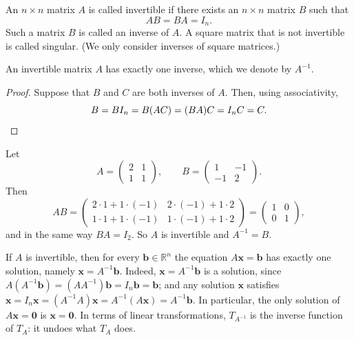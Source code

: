 \begin{definition}
    An $n \times n$ matrix $A$ is called invertible if there exists an $n \times n$ matrix $B$ such that
    \[AB = BA = I_n.\]
    Such a matrix $B$ is called an inverse of $A$. A square matrix that is not invertible is called singular. (We only consider inverses of square matrices.)
\end{definition}

\begin{proposition}
    An invertible matrix $A$ has exactly one inverse, which we denote by $A^{-1}$.
\end{proposition}

\begin{proof}
    Suppose that $B$ and $C$ are both inverses of $A$. Then, using associativity,
    \[B = B I_n = B(AC) = (BA)C = I_n C = C. \qedhere\]
\end{proof}

\begin{example}
    Let
    \[A = \begin{pmatrix}
        2 & 1 \\
        1 & 1
    \end{pmatrix}, \qquad B = \begin{pmatrix}
        1 & -1 \\
        -1 & 2
    \end{pmatrix}.\]
    Then
    \[AB = \begin{pmatrix}
        2 \cdot 1 + 1 \cdot (-1) & 2 \cdot (-1) + 1 \cdot 2 \\
        1 \cdot 1 + 1 \cdot (-1) & 1 \cdot (-1) + 1 \cdot 2
    \end{pmatrix} = \begin{pmatrix}
        1 & 0 \\
        0 & 1
    \end{pmatrix},\]
    and in the same way $BA = I_2$. So $A$ is invertible and $A^{-1} = B$.
\end{example}

\begin{remark}\label{L1-rem:inverse-solve}
    If $A$ is invertible, then for every $\mathbf{b} \in \mathbb{R}^n$ the equation $A\mathbf{x} = \mathbf{b}$ has exactly one solution, namely $\mathbf{x} = A^{-1}\mathbf{b}$. Indeed, $\mathbf{x} = A^{-1}\mathbf{b}$ is a solution, since $A(A^{-1}\mathbf{b}) = (AA^{-1})\mathbf{b} = I_n \mathbf{b} = \mathbf{b}$; and any solution $\mathbf{x}$ satisfies $\mathbf{x} = I_n \mathbf{x} = (A^{-1}A)\mathbf{x} = A^{-1}(A\mathbf{x}) = A^{-1}\mathbf{b}$. In particular, the only solution of $A\mathbf{x} = \mathbf{0}$ is $\mathbf{x} = \mathbf{0}$. In terms of linear transformations, $T_{A^{-1}}$ is the inverse function of $T_A$: it undoes what $T_A$ does.
\end{remark}

